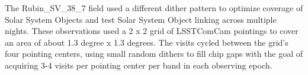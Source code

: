 The Rubin\_SV\_38\_7 field used a different dither pattern to optimize coverage of Solar System Objects and test Solar System Object linking across multiple nights.
These observations used a 2 x 2 grid of LSSTComCam pointings to cover an area of about 1.3 degree x 1.3 degrees. 
The visits cycled between the grid’s four pointing centers, using small random dithers to fill chip gaps with the goal of acquiring 3-4 visits per pointing center per band in each observing epoch.

    

